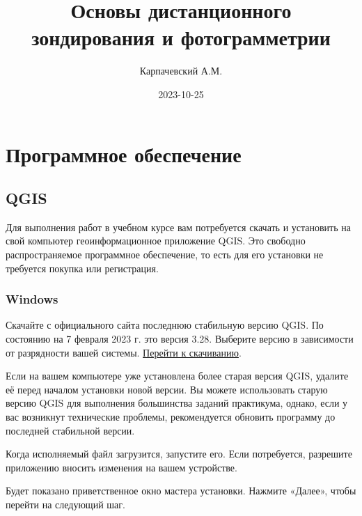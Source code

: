 \documentclass[
  12pt,
]{book}
\title{Основы дистанционного зондирования и фотограмметрии}
\author{Карпачевский А.М.}
\date{2023-10-25}
\begin{document}
\maketitle

{
\hypersetup{linkcolor=}
\setcounter{tocdepth}{1}
\tableofcontents
}
\hypertarget{ux43fux440ux43eux433ux440ux430ux43cux43cux43dux43eux435-ux43eux431ux435ux441ux43fux435ux447ux435ux43dux438ux435}{%
\chapter*{Программное обеспечение}\label{ux43fux440ux43eux433ux440ux430ux43cux43cux43dux43eux435-ux43eux431ux435ux441ux43fux435ux447ux435ux43dux438ux435}}

\hypertarget{qgis}{%
\section*{QGIS}\label{qgis}}

Для выполнения работ в учебном курсе вам потребуется скачать и установить на свой компьютер геоинформационное приложение QGIS. Это свободно распространяемое программное обеспечение, то есть для его установки не требуется покупка или регистрация.

\hypertarget{windows}{%
\subsection*{Windows}\label{windows}}

Скачайте с официального сайта последнюю стабильную версию QGIS. По состоянию на 7 февраля 2023 г. это версия 3.28. Выберите версию в зависимости от разрядности вашей системы. \href{https://qgis.org/downloads/QGIS-OSGeo4W-3.16.16-1.msi}{Перейти к скачиванию}.

Если на вашем компьютере уже установлена более старая версия QGIS, удалите её перед началом установки новой версии. Вы можете использовать старую версию QGIS для выполнения большинства заданий практикума, однако, если у вас возникнут технические проблемы, рекомендуется обновить программу до последней стабильной версии.

Когда исполняемый файл загрузится, запустите его. Если потребуется, разрешите приложению вносить изменения на вашем устройстве.

Будет показано приветственное окно мастера установки. Нажмите «Далее», чтобы перейти на следующий шаг.
\end{document}
